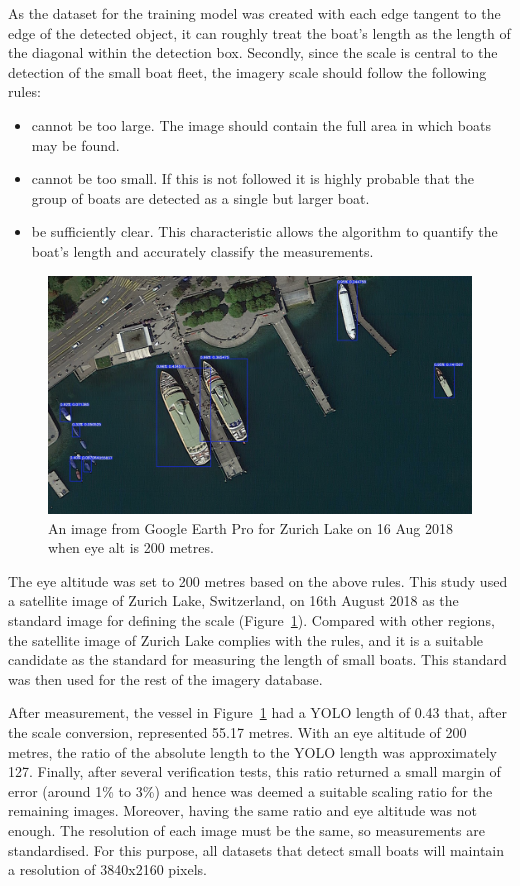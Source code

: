 As the dataset for the training model was created with each edge tangent to the edge of the detected object, it can roughly treat the boat's length as the length of the diagonal within the detection box. Secondly, since the scale is central to the detection of the small boat fleet, the imagery scale should follow the following rules:
\begin{itemize}
    \item cannot be too large. The image should contain the full area in which boats may be found.
    \item cannot be too small. If this is not followed it is highly probable that the group of boats are detected as a single but larger boat.
    \item be sufficiently clear. This characteristic allows the algorithm to quantify the boat's length and accurately classify the measurements.
\end{itemize}


\begin{figure}[t]
    \centering
    \includegraphics[width=\columnwidth]{img/zurich.jpeg}
    \caption{An image from Google Earth Pro for Zurich Lake on 16 Aug 2018 when eye alt is 200 metres.}
    \label{fig:zurich}
\end{figure}

The eye altitude was set to 200 metres based on the above rules. This study used a satellite image of Zurich Lake, Switzerland, on 16th August 2018 as the standard image for defining the scale (Figure~\ref{fig:zurich}). Compared with other regions, the satellite image of Zurich Lake complies with the rules, and it is a suitable candidate as the standard for measuring the length of small boats. This standard was then used for the rest of the imagery database.

After measurement, the vessel in Figure~\ref{fig:zurich} had a YOLO length of 0.43 that, after the scale conversion, represented 55.17 metres. With an eye altitude of 200 metres, the ratio of the absolute length to the YOLO length was approximately 127. Finally, after several verification tests, this ratio returned a small margin of error (around 1\% to 3\%) and hence was deemed a suitable scaling ratio for the remaining images. Moreover, having the same ratio and eye altitude was not enough. The resolution of each image must be the same, so measurements are standardised. For this purpose, all datasets that detect small boats will maintain a resolution of 3840x2160 pixels.

